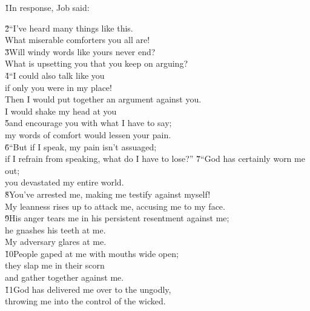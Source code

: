 \v{1}In response, Job said:

\begin{poetry}
\poeml \v{2}``I've heard many things like this. \\
\poemll    What miserable comforters you all are! \\
\poeml \v{3}Will windy words like yours never end? \\
\poemll    What is upsetting you that you keep on arguing? \\
\poeml \v{4}``I could also talk like you \\
\poemll    if only you were in my place! \\
\poeml Then I would put together an argument against you. \\
\poemll    I would shake my head at you \\
\poeml \v{5}and encourage you with what I have to say; \\
\poemll    my words of comfort would lessen your pain. \\
\poeml \v{6}``But if I speak, my pain isn't assuaged; \\
\poemll    if I refrain from speaking, what do I have to lose?''
\poeml \v{7}``God has certainly worn me out; \\
\poemll    you devastated my entire world. \\
\poeml \v{8}You've arrested me, making me testify against myself! \\
\poemll    My leanness rises up to attack me, accusing me to my face. \\
\poeml \v{9}His anger tears me in his persistent resentment against me; \\
\poemll    he gnashes his teeth at me. \\
\poemlll       My adversary glares at me. \\
\poeml \v{10}People gaped at me with mouths wide open; \\
\poemll    they slap me in their scorn \\
\poemlll       and gather together against me. \\
\poeml \v{11}God has delivered me over to the ungodly, \\
\poemll    throwing me into the control of the wicked. \\

\end{poetry}
